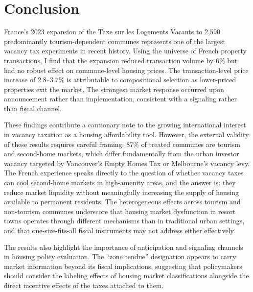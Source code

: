 \documentclass[12pt]{article}
\begin{document}
{\section{Conclusion}

France's 2023 expansion of the Taxe sur les Logements Vacants to 2,590 predominantly tourism-dependent communes represents one of the largest vacancy tax experiments in recent history. Using the universe of French property transactions, I find that the expansion reduced transaction volume by 6\% but had no robust effect on commune-level housing prices. The transaction-level price increase of 2.8--3.7\% is attributable to compositional selection as lower-priced properties exit the market. The strongest market response occurred upon announcement rather than implementation, consistent with a signaling rather than fiscal channel.

These findings contribute a cautionary note to the growing international interest in vacancy taxation as a housing affordability tool. However, the external validity of these results requires careful framing: 87\% of treated communes are tourism and second-home markets, which differ fundamentally from the urban investor vacancy targeted by Vancouver's Empty Homes Tax or Melbourne's vacancy levy. The French experience speaks directly to the question of whether vacancy taxes can cool second-home markets in high-amenity areas, and the answer is: they reduce market liquidity without meaningfully increasing the supply of housing available to permanent residents. The heterogeneous effects across tourism and non-tourism communes underscore that housing market dysfunction in resort towns operates through different mechanisms than in traditional urban settings, and that one-size-fits-all fiscal instruments may not address either effectively.

The results also highlight the importance of anticipation and signaling channels in housing policy evaluation. The ``zone tendue'' designation appears to carry market information beyond its fiscal implications, suggesting that policymakers should consider the labeling effects of housing market classifications alongside the direct incentive effects of the taxes attached to them.

}
\end{document}
